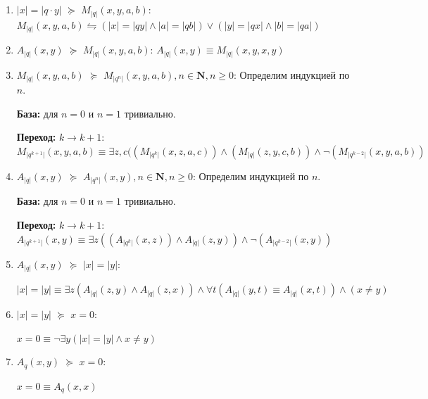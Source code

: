 \documentclass[12pt]{article}
\theoremstyle{definition}
\newcommand{\wed}{\wedge} %
\begin{document}
\begin{enumerate}
	    \textbf{Переход:} $k \rightarrow k+1$:
	    $|x| = |q^{k+1}\cdot y| \equiv \exists z ((|x| = |q^{k}\cdot z|)\wedge (|z| = |q\cdot y|)$ 
	    
	    
	    \item $|x| =|q\cdot y|$ $\succeq$ $M_{|q|}(x, y, a, b)$:
	    $ M_{|q|}(x, y, a, b) \leftrightharpoons (|x| = |qy| \wed |a| = |qb|) \vee (|y| = |qx| \wed |b| = |qa|) $
	    
	    
	    \item $A_{|q|}(x, y)$ $\succeq$ $M_{|q|}(x, y, a, b)$:
	    $A_{|q|}(x, y) \equiv M_{|q|}(x, y, x, y)$
	    
	    \item $M_{|q|}(x, y, a, b)$ $\succeq$ $M_{|q^n|}(x, y, a, b), n \in \mathbf{N}, n \ge 0$:
	    Определим индукцией по $n$. 
	    
	    \textbf{База:} для $n = 0$ и $n = 1$ тривиально.
	    
	    \textbf{Переход:} $k \rightarrow k+1$:
	    $M_{|q^{k+1}|}(x, y, a, b) \equiv \exists z, c ((M_{|q^k|}(x, z, a, c))\wedge (M_{|q|}(z, y, c, b)) \wedge \neg (M_{|q^{k-2}|}(x, y, a, b))$
	    
	    \item $A_{|q|}(x, y)$ $\succeq$ $A_{|q^n|}(x, y), n \in \mathbf{N}, n \ge 0$:
	    Определим индукцией по $n$. 
	    
	    \textbf{База:} для $n = 0$ и $n = 1$ тривиально.
	    
	    \textbf{Переход:} $k \rightarrow k+1$:
	    $A_{|q^{k+1}|}(x, y) \equiv \exists z ((A_{|q^{k}|}(x, z))\wedge A_{|q|}(z, y)) \wedge \neg (A_{|q^{k-2}|}(x, y))$
	    
	    \item $A_{|q|}(x, y)$ $\succeq$ $|x| = |y|$:
	    
	    $|x| = |y| \equiv \exists z(A_{|q|}(z, y) \wed A_{|q|}(z, x)) \wed \forall t (A_{|q|}(y, t) \equiv A_{|q|}(x, t)) \wed (x \neq y)$
	    
	    \item $|x| = |y|$ $\succeq$ $x = 0$: 
	    
	    $x = 0 \equiv \neg \exists y (|x| = |y| \wed x \neq y)$
	    
	    \item $A_{q}(x, y)$ $\succeq$ $x=0$:
	    
	    $x = 0 \equiv A_{q}(x, x)$
	    
	\end{enumerate}
	
	
\end{document}
